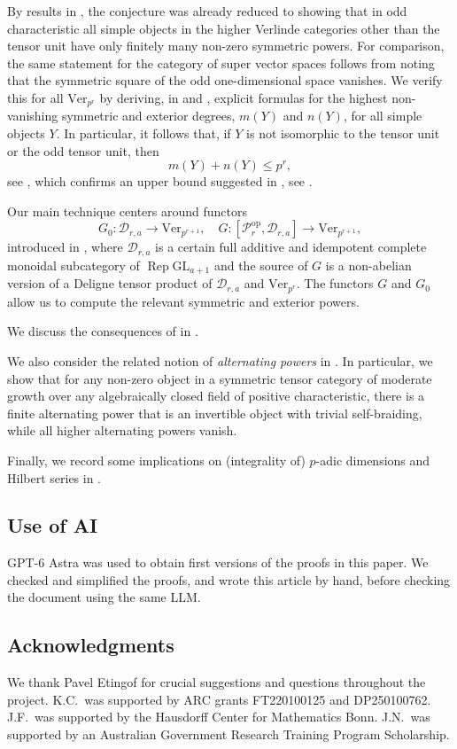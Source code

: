 \documentclass[11pt,oneside]{amsart}
\theoremstyle{definition}
\theoremstyle{remark}
\numberwithin{equation}{section}
\newcommand\op{^{\mathrm{op}}}
\newcommand\cD{\mathcal D}
\newcommand\cP{\mathcal P}
\newcommand\Ver{\mathrm{Ver}}
\newcommand\GL{\mathrm{GL}}
\newcommand\Rep{\operatorname{Rep}}
\renewcommand\:\colon
\begin{document}
By results in \cite{CEO-incompressible}, the conjecture was already reduced to showing that in odd characteristic all simple objects in the higher Verlinde categories other than the tensor unit have only finitely many non-zero symmetric powers. For comparison, the same statement for the category of super vector spaces follows from noting that the symmetric square of the odd one-dimensional space vanishes. We verify this for all $\Ver_{p^r}$ by deriving, in  and , explicit formulas for the highest non-vanishing symmetric and exterior degrees, $m(Y)$ and $n(Y)$, for all simple objects $Y$. In particular, it follows that, if $Y$ is not isomorphic to the tensor unit or the odd tensor unit, then
$$
m(Y) + n(Y) \le p^r ,
$$
see , which confirms an upper bound suggested in \cite{CEN}, see .

Our main technique centers around functors
$$
G_0\: \cD_{r,a}\to\Ver_{p^{r+1}} ,\quad
G\: [\cP_r\op,\cD_{r,a}] \to \Ver_{p^{r+1}} ,
$$
introduced in , where $\cD_{r,a}$ is a certain full additive and idempotent complete monoidal subcategory of $\Rep\GL_{a+1}$ and the source of $G$ is a non-abelian version of a Deligne tensor product of $\cD_{r,a}$ and $\Ver_{p^r}$. The functors $G$ and $G_0$ allow us to compute the relevant symmetric and exterior powers.

We discuss the consequences of  in .

We also consider the related notion of \emph{alternating powers} in . In particular, we show that for any non-zero object in a symmetric tensor category of moderate growth over any algebraically closed field of positive characteristic, there is a finite alternating power that is an invertible object with trivial self-braiding, while all higher alternating powers vanish.

Finally, we record some implications on (integrality of) $p$-adic dimensions and Hilbert series in .

\subsection*{Use of AI} {GPT-6} Astra was used to obtain first versions of the proofs in this paper. We checked and simplified the proofs, and wrote this article by hand, before checking the document using the same LLM. 

\subsection*{Acknowledgments} We thank Pavel Etingof for crucial suggestions and questions throughout the project. K.C.~was supported by ARC grants FT220100125 and DP250100762. J.F.~was supported by the Hausdorff Center for Mathematics Bonn. J.N.~was supported by an Australian Government Research Training Program Scholarship.
\end{document}
